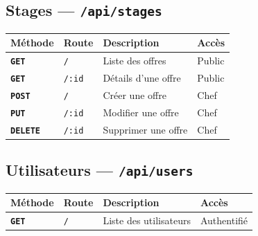 \documentclass[12pt,a4paper]{article}
\newcommand{\route}[1]{\texorpdfstring{\texttt{\small\color{routeGray}#1}}{#1}}
\newcommand{\httpmethod}[1]{%
  \ifstrequal{#1}{GET}{\colorbox{blue!15}{\texttt{\bfseries\color{blue!70!black}GET}}}{}%
  \ifstrequal{#1}{POST}{\colorbox{green!18}{\texttt{\bfseries\color{green!60!black}POST}}}{}%
  \ifstrequal{#1}{PUT}{\colorbox{orange!18}{\texttt{\bfseries\color{orange!70!black}PUT}}}{}%
  \ifstrequal{#1}{DELETE}{\colorbox{red!15}{\texttt{\bfseries\color{red!70!black}DELETE}}}{}%
}
\begin{document}
\subsection{Stages — \route{/api/stages}}

\begin{center}
\begin{tabular}{l>{\raggedright\arraybackslash}p{5.6cm}>{\raggedright\arraybackslash}p{4.4cm}l}
  \toprule
  \textbf{Méthode} & \textbf{Route} & \textbf{Description} & \textbf{Accès} \\
  \midrule
  \httpmethod{GET} & \texttt{/} & Liste des offres & Public \\
  \httpmethod{GET} & \texttt{/:id} & Détails d'une offre & Public \\
  \httpmethod{POST} & \texttt{/} & Créer une offre & Chef \\
  \httpmethod{PUT} & \texttt{/:id} & Modifier une offre & Chef \\
  \httpmethod{DELETE} & \texttt{/:id} & Supprimer une offre & Chef \\
  \bottomrule
\end{tabular}
\end{center}

\subsection{Utilisateurs — \route{/api/users}}

\begin{center}
\begin{tabular}{l>{\raggedright\arraybackslash}p{5.6cm}>{\raggedright\arraybackslash}p{4.4cm}l}
  \toprule
  \textbf{Méthode} & \textbf{Route} & \textbf{Description} & \textbf{Accès} \\
  \midrule
  \httpmethod{GET} & \texttt{/} & Liste des utilisateurs & Authentifié \\
  \bottomrule
\end{tabular}
\end{center}
\end{document}

